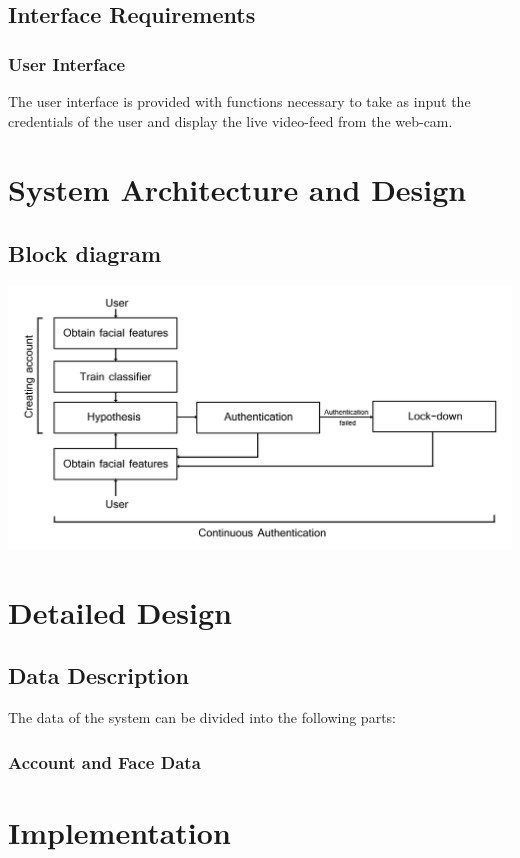 \documentclass[12pt]{article}			%
\begin{document}
\subsection{ Interface Requirements }
\subsubsection{ User Interface }
The user interface is provided with functions necessary to take as input the credentials of the user and display the live video-feed from the web-cam.

\section{ System Architecture and Design }  
\subsection{ Block diagram }
\begin{center}
    \includegraphics[scale=0.8]{block.png}
\end{center}

\section{ Detailed Design }
\subsection{ Data Description }
The data of the system can be divided into the following parts:
\subsubsection{ Account and Face Data }
  

\section{ Implementation }  
\end{document}
